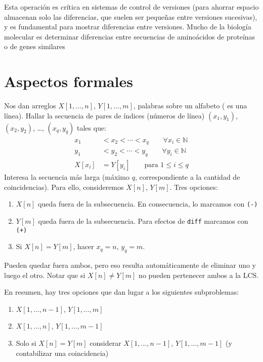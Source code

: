   Esta operación es crítica en sistemas de control de versiones
  (para ahorrar espacio almacenan solo las diferencias,
   que suelen ser pequeñas entre versiones sucesivas),
  y es fundamental para mostrar diferencias entre versiones.
  Mucho de la biología molecular
  es determinar diferencias
  entre secuencias de aminoácidos de proteínas
  o de genes similares

\section{Aspectos formales}

  Nos dan arreglos \(X[1, \ldots, n]\), \(Y[1, \ldots, m]\),
  palabras sobre un alfabeto ( es una línea).
  Hallar la secuencia de pares de índices
  (números de línea)
  \((x_1, y_1)\), \((x_2, y_2)\), \ldots, \((x_q, y_q)\) tales que:
  \begin{align*}
    x_1	   &< x_2 < \dotsb < x_q \qquad	 \forall x_i \in \mathbb{N} \\
    y_1	   &< y_2 < \dotsb < y_q \qquad	 \forall y_i \in \mathbb{N} \\
    X[x_i] &= Y[y_i] \qquad \text{para \(1 \le i \le q\)}
  \end{align*}
  Interesa la secuencia más larga
  (máximo \(q\),
   correspondiente a la cantidad de coincidencias).
  Para ello,
  consideremos \(X[n]\), \(Y[m]\).
  Tres opciones:
  \begin{enumerate}
  \item
    \(X[n]\) queda fuera de la subsecuencia.
    En consecuencia, lo marcamos con \texttt{(-)}
  \item
    \(Y[m]\) queda fuera de la subsecuencia.
    Para efectos de \texttt{diff} marcamos con \texttt{(+)}
  \item
    Si \(X[n] = Y[m]\), hacer \(x_q = n\), \(y_q = m\).
  \end{enumerate}
  Pueden quedar fuera ambos,
  pero eso resulta automáticamente de eliminar uno y luego el otro.
  Notar que si \(X[n] \ne Y[m]\) no pueden pertenecer ambos a la LCS.

  En resumen,
  hay tres opciones
  que dan lugar a los siguientes subproblemas:
  \begin{enumerate}
  \item
    \(X[1, \dotsc, n - 1]\), \(Y[1, \dotsc, m]\)
  \item
    \(X[1, \dotsc, n]\), \(Y[1, \dotsc, m - 1]\)
  \item
    Solo si \(X[n] = Y[m]\)
    considerar \(X[1, \dotsc, n - 1]\), \(Y[1, \dotsc, m - 1]\)
    (y contabilizar una coincidencia)
  \end{enumerate}

